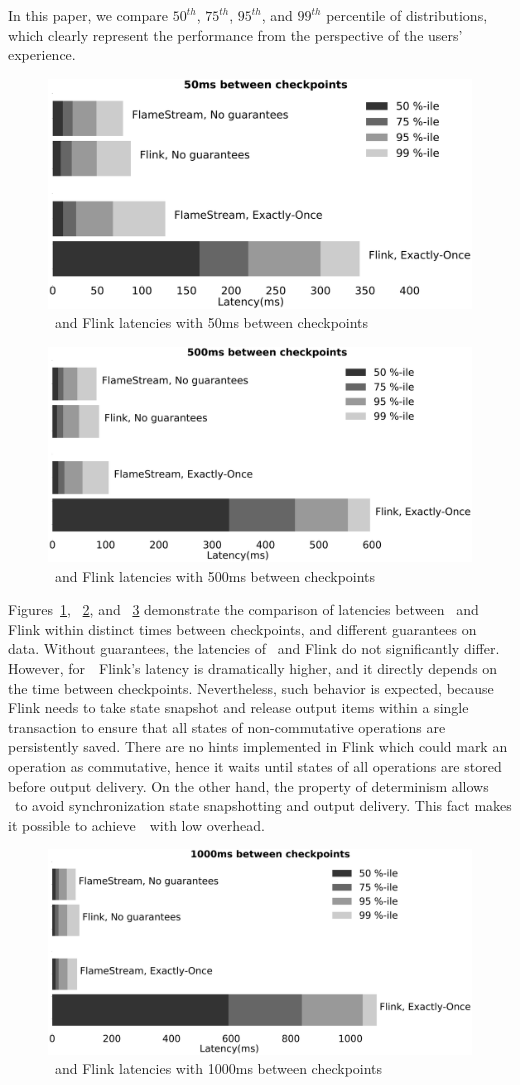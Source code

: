 In this paper, we compare $50^{th}$, $75^{th}$, $95^{th}$, and $99^{th}$ percentile of distributions, which clearly represent the performance from the perspective of the users' experience.

\begin{figure}[htbp]
  \centering
  \includegraphics[width=.48\textwidth]{pics/comparison50}
  \caption{\FlameStream\ and Flink latencies with 50ms between checkpoints}
  \label{comparison50}
\end{figure}

\begin{figure}[htbp]
  \centering
  \includegraphics[width=.48\textwidth]{pics/comparison500}
  \caption{\FlameStream\ and Flink latencies with 500ms between checkpoints}
  \label{comparison500}
\end{figure}

Figures~\ref{comparison50}, ~\ref{comparison500}, and ~\ref{comparison1000} demonstrate      the comparison of latencies between \FlameStream\ and Flink within distinct times between checkpoints, and different guarantees on data. Without guarantees, the latencies of \FlameStream\ and Flink do not significantly differ. However, for~\eo\, Flink's latency is dramatically higher, and it directly depends on the time between checkpoints. Nevertheless, such behavior is expected, because Flink needs to take state snapshot and release output items within a single transaction to ensure that all states of non-commutative operations are persistently saved. There are no hints implemented in Flink which could mark an operation as commutative, hence it waits until states of all operations are stored before output delivery. 
On the other hand, the property of determinism allows \FlameStream\ to avoid synchronization state snapshotting and output delivery. This fact makes it possible to achieve~\eo\ with low overhead.

\begin{figure}[htbp]
  \centering
  \includegraphics[width=.48\textwidth]{pics/comparison1000}
  \caption{\FlameStream\ and Flink latencies with 1000ms between checkpoints}
  \label{comparison1000}
\end{figure}
